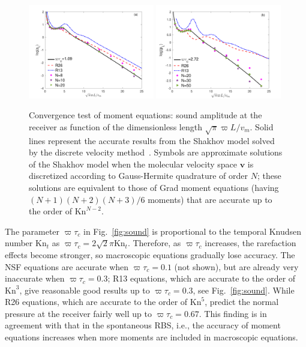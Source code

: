 \begin{figure}[t]
	\centering
	\includegraphics[width=0.49\textwidth]{FluidDynamic/IMG/testOmgTau1_09Copy.pdf}
	\includegraphics[width=0.49\textwidth]{FluidDynamic/IMG/testOmgTau2_72.pdf} 
	\caption{ Convergence test of moment equations: sound amplitude at the receiver as function of the dimensionless length $\sqrt\pi\varpi{L}/v_m$. Solid lines represent the accurate results from the Shakhov model solved by the discrete velocity method~\citep{SuArXiv2019}. Symbols are approximate solutions of the Shakhov model when the molecular velocity space $\bm{v}$ is discretized according to Gauss-Hermite quadrature of order $N$; these solutions are equivalent to those of Grad moment equations (having $(N+1)(N+2)(N+3)/6$ moments) that are accurate up to the order of $\text{Kn}^{N-2}$.  }
	\label{fig:sound_convergence}
\end{figure}


The parameter $\varpi{\tau_c}$ in Fig.~\ref{fig:sound} is proportional to the temporal Knudsen number $\text{Kn}_t$ as $\varpi{\tau_c}=2\sqrt{2}\pi\text{Kn}_t$. Therefore, as $\varpi{\tau_c}$ increases, the rarefaction effects become stronger, so macroscopic equations gradually lose accuracy. The NSF equations are accurate when $\varpi{\tau_c}=0.1$ (not shown), but are already very inaccurate when $\varpi{\tau_c}=0.3$; R13 equations, which are accurate to the order of $\text{Kn}^3$, give reasonable good results up to $\varpi{\tau_c}=0.3$, see  Fig.~\ref{fig:sound}. While R26 equations, which are accurate to the order of $\text{Kn}^5$, predict the normal pressure at the receiver fairly well up to $\varpi\tau_c=0.67$. This finding is in agreement with that in the spontaneous RBS, i.e., the accuracy of moment equations increases when more moments are included in macroscopic equations.  





